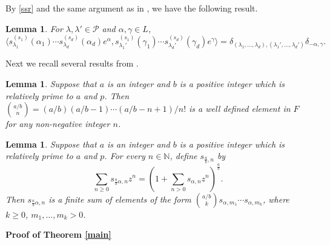 \documentclass[12pt]{article}
\def\NN{{\mathbb N}}
\newtheorem{lem}[thm]{Lemma}
\begin{document}
By \eqref{ssr} and the same argument as in \cite[Proposition 3.6]{ivoa}, we have the following result. 

\begin{lem}
For $\lambda, \lambda' \in \mathcal{P}$ and $\alpha, \gamma\in L$,
\[
\langle s_{\lambda_1}^{(s_1)}(\alpha_1)\cdots s_{\lambda_d}^{(s_d)}(\alpha_d)e^{\alpha}, s_{\lambda_1'}^{(s_1)}(\gamma_1)\cdots s_{\lambda_d'}^{(s_d)}(\gamma_d)e^{\gamma} 
\rangle 
=\delta_{(\lambda_1, \dots, \lambda_d), (\lambda_1', \dots, \lambda_d')} \delta_{-\alpha, \gamma}. 
\] 
\end{lem}

Next we recall several results from \cite{Mu}.
\begin{lem}
Suppose that $a$ is an integer and $b$ is a positive integer which is relatively
prime to $a$ and $p$. Then $\binom{a/b}{n}= (a/b)(a/b-1) \cdots (a/b-n+1)/ n!$ is a well defined element in $F$ for any non-negative integer $n$. 
\end{lem}


\begin{lem}
Suppose that $a$ is an integer and $b$ is a positive integer which is relatively
prime to $a$ and $p$. For every $n\in \NN$, define $s_{\frac{a}b, n}$ by\
\[
\sum_{n\geq 0} s_{\frac{a}b \alpha,n} z^n =\left( 1+ \sum_{n> 0} s_{\alpha,n} z^n\right )^{\frac{a}b}.  
\] 
Then $s_{\frac{a}b \alpha,n}$ is a finite sum of elements of the form 
$\binom{{a}/b}{k} s_{\alpha, m_1}\cdots s_{\alpha, m_k}$, where $k\geq 0$, $m_1, \dots, m_k>0$.   
\end{lem}



\noindent \textbf{Proof of Theorem \ref{main}}
\end{document}

